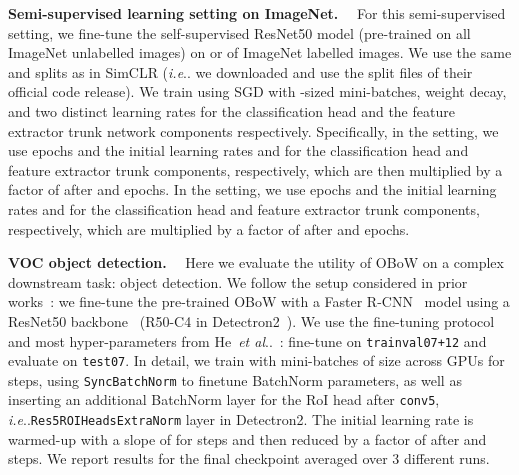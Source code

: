 \documentclass[final]{cvpr}
\makeatletter
\newcommand{\parag}[1]{\smallskip\noindent\textbf{#1}~~}
\newcommand{\resnetfifty}{ResNet50\xspace}
\DeclareRobustCommand\onedot{\futurelet\@let@token\@onedot}
\def\@onedot{\ifx\@let@token.\else.\null\fi\xspace}
\def\ie{\emph{i.e}\onedot} \def\Ie{\emph{I.e}\onedot}
\def\etal{\emph{et al}\onedot}
\makeatother
\begin{document}
\parag{Semi-supervised learning setting on ImageNet.}
For this semi-supervised setting, we fine-tune the self-supervised \resnetfifty model (pre-trained on all ImageNet unlabelled images) on  or  of ImageNet labelled images. 
We use the same  and  splits as in SimCLR (\ie we downloaded and use the split files of their official code release).
We train using SGD with -sized mini-batches,  weight decay, and two distinct learning rates for the classification head and the feature extractor trunk network components respectively. 
Specifically, in the  setting, we use  epochs and the initial learning rates  and  for the classification head and feature extractor trunk components, respectively, which are then multiplied by a factor of  after  and  epochs.
In the  setting, we use  epochs and the initial learning rates  and  for the classification head and feature extractor trunk components, respectively, which are multiplied by a factor of  after  and  epochs.

\parag{VOC object detection.}
Here we evaluate the utility of OBoW on a complex downstream task: 
object detection. We follow the setup considered in prior works~\cite{caron2020unsupervised, gidaris2020learning, goyal2019scaling, he2020momentum, misra2020self}: we fine-tune the pre-trained OBoW with a Faster R-CNN~\cite{ren2015faster} model using a \resnetfifty  backbone~\cite{he2017mask} (R50-C4 in Detectron2~\cite{wu2019detectron2}). We use
the fine-tuning protocol and most hyper-parameters from He~\etal~\cite{he2020momentum}: fine-tune on \texttt{trainval07+12} and evaluate on \texttt{test07}. In detail, we train with mini-batches of size  across  GPUs for  steps, using \texttt{SyncBatchNorm} to finetune BatchNorm parameters, as well as inserting an additional BatchNorm layer for the RoI head after  \texttt{conv5}, \ie \texttt{Res5ROIHeadsExtraNorm} layer in Detectron2. The initial learning rate  is warmed-up with a slope of  for  steps and then reduced by a factor of  after  and  steps. We report results for the final checkpoint averaged over 3 different runs. 
\end{document}
